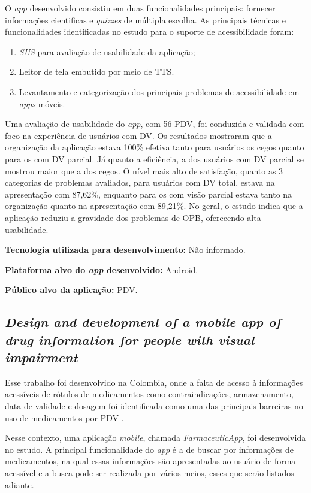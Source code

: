 O \emph{app} desenvolvido consistiu em duas funcionalidades principais: fornecer informações cientificas e \emph{quizzes} de múltipla escolha.
As principais técnicas e funcionalidades identificadas no estudo para o suporte de acessibilidade foram:

\begin{enumerate}
    \item \emph{SUS} para avaliação de usabilidade da aplicação;
    \item Leitor de tela embutido por meio de TTS\@.
    \item Levantamento e categorização dos principais problemas de acessibilidade em \emph{apps} móveis.
\end{enumerate}

Uma avaliação de usabilidade do \emph{app}, com 56 PDV, foi conduzida e validada com foco na experiência de usuários com DV\@.
Os resultados mostraram que a organização da aplicação estava 100\% efetiva tanto para usuários os cegos quanto para os com DV parcial.
Já quanto a eficiência, a dos usuários com DV parcial se mostrou maior que a dos cegos.
O nível mais alto de satisfação, quanto as 3 categorias de problemas avaliados, para usuários com DV total, estava na apresentação com 87,62\%, enquanto para os com visão parcial estava tanto na organização quanto na apresentação com 89,21\%.
No geral, o estudo indica que a aplicação reduziu a gravidade dos problemas de OPB, oferecendo alta usabilidade.

\textbf{Tecnologia utilizada para desenvolvimento:} Não informado.

\textbf{Plataforma alvo do \emph{app} desenvolvido:} Android.

\textbf{Público alvo da aplicação:} PDV\@.

\subsection{\emph{Design and development of a mobile app of drug information for people with visual impairment}}

Esse trabalho foi desenvolvido na Colombia, onde a falta de acesso à informações acessíveis
de rótulos de medicamentos como contraindicações, armazenamento, data de validade e dosagem foi identificada como uma
das principais barreiras no uso de medicamentos por PDV \cite{Amariles2020}.

Nesse contexto, uma aplicação \emph{mobile}, chamada \emph{FarmaceuticApp}, foi desenvolvida no estudo.
A principal funcionalidade do \emph{app} é a de buscar por informações de medicamentos, na qual essas informações
são apresentadas ao usuário de forma acessível e a busca pode ser realizada por vários meios, esses que serão listados adiante.


